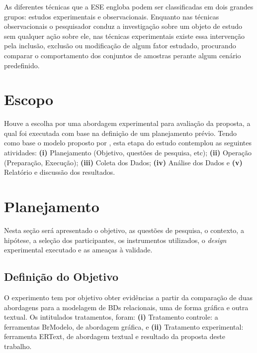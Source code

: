 As diferentes técnicas que a \ac{ESE} engloba podem ser classificadas em dois grandes grupos: estudos experimentais e observacionais. 
Enquanto nas técnicas observacionais o pesquisador conduz a investigação sobre um objeto de estudo sem qualquer ação sobre ele, nas técnicas experimentais existe essa intervenção pela inclusão, exclusão ou modificação de algum fator estudado, procurando comparar o comportamento dos conjuntos de amostras perante algum cenário predefinido.

\section{Escopo} \label{sec:escopoExp}

Houve a escolha por uma abordagem experimental para avaliação da proposta, a qual foi executada com base na definição de um planejamento prévio. 
Tendo como base o modelo proposto por , esta etapa do estudo contemplou as seguintes atividades: \textbf{(i)} Planejamento (Objetivo, questões de pesquisa, etc); \textbf{(ii)} Operação (Preparação, Execução); \textbf{(iii)} Coleta dos Dados; \textbf{(iv)} Análise dos Dados e \textbf{(v)} Relatório e discussão dos resultados.

\section{Planejamento} \label{ssec:planejExp}
Nesta seção será apresentado o objetivo, as questões de pesquisa, o contexto, a hipótese,  a seleção dos participantes, os instrumentos utilizados, o \textit{design} experimental executado e as ameaças à validade. 

\subsection{Definição do Objetivo} \label{ssec:defObj}

O experimento tem por objetivo obter evidências a partir da comparação de duas abordagens para a modelagem de \acp{BD} relacionais, uma de forma gráfica e outra textual. 
Os intitulados tratamentos, foram: 
\textbf{(i)} Tratamento controle: a ferramentas BrModelo, de abordagem gráfica, e \textbf{(ii)} Tratamento experimental: ferramenta ERText, de abordagem textual e resultado da proposta deste trabalho.

